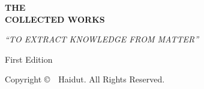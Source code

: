 \begin{fullwidth}

\begin{center}
{\fontsize{14pt}{18pt}\selectfont{}}

\vspace*{8\baselineskip}

{\fontsize{36pt}{40pt}\selectfont\textbf{THE}}\\[12pt]
{\fontsize{36pt}{40pt}\selectfont\textbf{COLLECTED WORKS}}

\vspace*{3\baselineskip}

{\fontsize{14pt}{18pt}\selectfont\textit{\enquote{TO EXTRACT KNOWLEDGE FROM MATTER}}}

\vspace*{4\baselineskip}

{\fontsize{18pt}{22pt}\selectfont\textbf{\covervolume}}

\vspace*{\baselineskip}

{\fontsize{14pt}{18pt}\selectfont\coveryear}

\vspace*{\baselineskip}

{\fontsize{12pt}{16pt}\selectfont First Edition}

\vfill

{\footnotesize Copyright \copyright\ \coveryear\ Haidut. All Rights Reserved.}

\end{center}

\end{fullwidth}